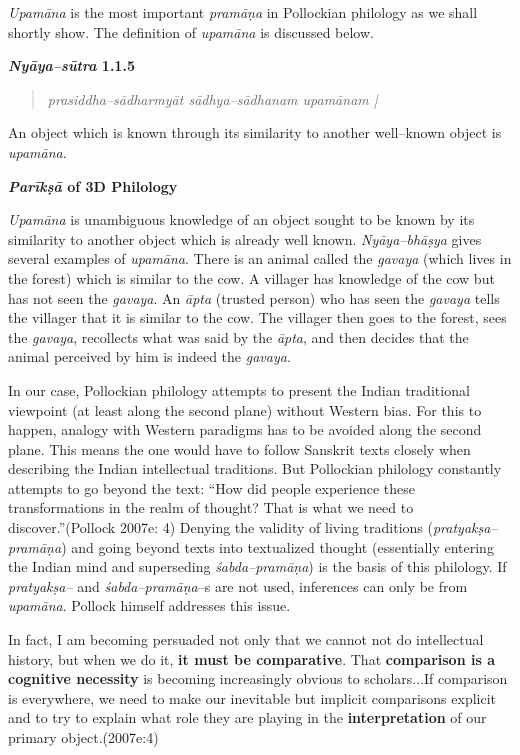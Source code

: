 \textit{Upamāna }is the most important \textit{pramāṇa} in Pollockian philology as we shall shortly show. The definition of \textit{upamāna} is discussed below.

\textbf{\textit{Nyāya–sūtra} 1.1.5}

\begin{verse}
\textit{prasiddha–sādharmyāt sādhya–sādhanam upamānam |}
\end{verse}

An object which is known through its similarity to another well–known object is \textit{upamāna}.

\textbf{\textit{Parīkṣā} of 3D Philology}

\textit{Upamāna }is unambiguous knowledge of an object sought to be known by its similarity to another object which is already well known. \textit{Nyāya–bhāṣya} gives several examples of \textit{upamāna}. There is an animal called the \textit{gavaya} (which lives in the forest) which is similar to the cow. A villager has knowledge of the cow but has not seen the \textit{gavaya}. An \textit{āpta }(trusted person) who has seen the \textit{gavaya} tells the villager that it is similar to the cow. The villager then goes to the forest, sees the \textit{gavaya}, recollects what was said by the \textit{āpta}, and then decides that the animal perceived by him is indeed the \textit{gavaya}.

In our case, Pollockian philology attempts to present the Indian traditional viewpoint (at least along the second plane) without Western bias. For this to happen, analogy with Western paradigms has to be avoided along the second plane. This means the one would have to follow Sanskrit texts closely when describing the Indian intellectual traditions. But Pollockian philology constantly attempts to go beyond the text: “How did people experience these transformations in the realm of thought? That is what we need to discover.”(Pollock 2007e: 4) Denying the validity of living traditions (\textit{pratyakṣa–pramāṇa}) and going beyond texts into textualized thought (essentially entering the Indian mind and superseding \textit{śabda–pramāṇa}) is the basis of this philology. If \textit{pratyakṣa– }and \textit{śabda–pramāṇa}–s are not used, inferences can only be from \textit{upamāna}. Pollock himself addresses this issue.

\begin{myquote}
In fact, I am becoming persuaded not only that we cannot not do intellectual history, but when we do it, \textbf{it must be comparative}. That \textbf{comparison is a cognitive necessity} is becoming increasingly obvious to scholars...If comparison is everywhere, we need to make our inevitable but implicit comparisons explicit and to try to explain what role they are playing in the \textbf{interpretation} of our primary object.(2007e:4)
\end{myquote}

